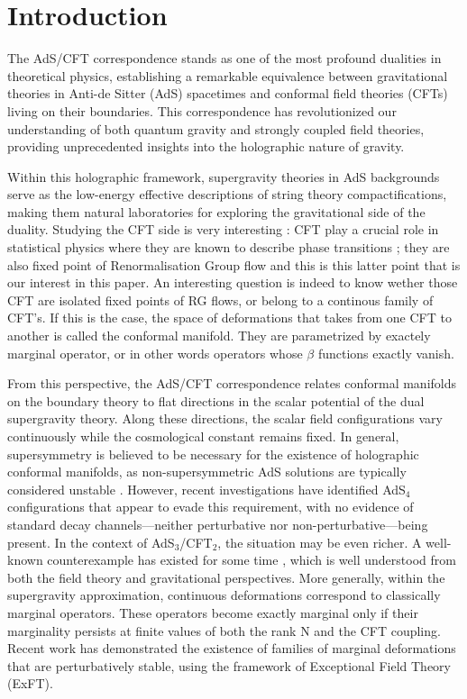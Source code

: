 \documentclass[11pt]{article}
\begin{document}
\section{Introduction}

The AdS/CFT correspondence \cite{Maldacena:1997re} stands as one of the most profound dualities in theoretical physics, establishing a remarkable equivalence between gravitational theories in Anti-de Sitter (AdS) spacetimes and conformal field theories (CFTs) living on their boundaries. This correspondence has revolutionized our understanding of both quantum gravity and strongly coupled field theories, providing unprecedented insights into the holographic nature of gravity. 

Within this holographic framework, supergravity theories in AdS backgrounds serve as the low-energy effective descriptions of string theory compactifications, making them natural laboratories for exploring the gravitational side of the duality. Studying the CFT side is very interesting : CFT play a crucial role in statistical physics where they are known to describe phase transitions ; they are also fixed point of Renormalisation Group flow and this is this latter point that is our interest in this paper. An interesting question is indeed to know wether those CFT are isolated fixed points of RG flows, or belong to a continous family of CFT's. If this is the case, the space of deformations that takes from one CFT to another is called the conformal manifold. They are parametrized by exactely marginal operator, or in other words operators whose $\beta$ functions exactly vanish. 

From this perspective, the AdS/CFT correspondence relates conformal manifolds on the boundary theory to flat directions in the scalar potential of the dual supergravity theory. Along these directions, the scalar field configurations vary continuously while the cosmological constant remains fixed. In general, supersymmetry is believed to be necessary for the existence of holographic conformal manifolds, as non-supersymmetric AdS solutions are typically considered unstable \cite{Ooguri:2016pdq,Palti:2019pca}. However, recent investigations \cite{Giambrone:2021wsm} have identified AdS$_4$ configurations that appear to evade this requirement, with no evidence of standard decay channels—neither perturbative nor non-perturbative—being present. In the context of AdS$_3$/CFT$_2$, the situation may be even richer. A well-known counterexample has existed for some time \cite{Aharony:2001dp,Dong:2014tsa}, which is well understood from both the field theory and gravitational perspectives. More generally, within the supergravity approximation, continuous deformations correspond to classically marginal operators. These operators become exactly marginal only if their marginality persists at finite values of both the rank N and the CFT coupling. Recent work \cite{Eloy:2024lwn} has demonstrated the existence of families of marginal deformations that are perturbatively stable, using the framework of Exceptional Field Theory (ExFT).
\end{document}
